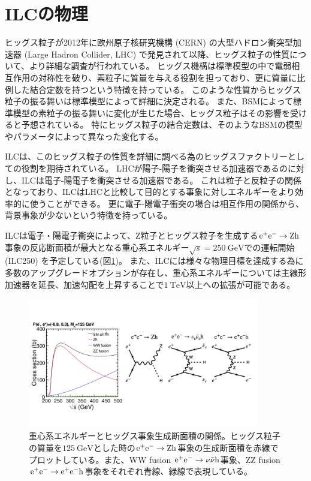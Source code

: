 \section{ILCの物理} \label{Intro:PhysicsofILC}

ヒッグス粒子が2012年に欧州原子核研究機構 (CERN) の大型ハドロン衝突型加速器 (Large Hadron Collider, LHC) で発見されて以降、ヒッグス粒子の性質について、より詳細な調査が行われている。
ヒッグス機構は標準模型の中で電弱相互作用の対称性を破り、素粒子に質量を与える役割を担っており、更に質量に比例した結合定数を持つという特徴を持っている。
このような性質からヒッグス粒子の振る舞いは標準模型によって詳細に決定される。
また、BSMによって標準模型の素粒子の振る舞いに変化が生じた場合、ヒッグス粒子はその影響を受けると予想されている。
特にヒッグス粒子の結合定数は、そのようなBSMの模型やパラメータによって異なった変化する。

ILCは、このヒッグス粒子の性質を詳細に調べる為のヒッグスファクトリーとしての役割を期待されている。
LHCが陽子-陽子を衝突させる加速器であるのに対し、ILCは電子-陽電子を衝突させる加速器である。
これは粒子と反粒子の関係となっており、ILCはLHCと比較して目的とする事象に対しエネルギーをより効率的に使うことができる。
更に電子-陽電子衝突の場合は相互作用の関係から、背景事象が少ないという特徴を持っている。

ILCは電子・陽電子衝突によって、Z粒子とヒッグス粒子を生成する$\rm e^+e^- \to Zh$事象の反応断面積が最大となる重心系エネルギー$\sqrt{s}=250\ \mathrm{GeV}$での運転開始 (ILC250) を予定している(図\ref{4eetoZH})。
また、ILCには様々な物理目標を達成する為に多数のアップグレードオプションが存在し、重心系エネルギーについては主線形加速器を延長、加速勾配を上昇することで$1\ \mathrm{TeV}$以上への拡張が可能である。

\begin{figure}[htbp]
 \centering
 \includegraphics[trim= 0 50 0 50, width=0.9\textwidth, clip]{Figure/1Introduction/4eetoZH.png}
 \caption[重心系エネルギーとヒッグス事象生成断面積の関係]{重心系エネルギーとヒッグス事象生成断面積の関係\cite{ILCTDRVP}。ヒッグス粒子の質量を$125\ \mathrm{GeV}$とした時の$\rm e^+e^- \to Zh$事象の生成断面積を赤線でプロットしている。また、WW fusion $\rm e^+e^- \to \nu \bar{\nu} h$事象、ZZ fusion $\rm e^+e^- \to e^+ e^- h$事象をそれぞれ青線、緑線で表現している。}
 \label{4eetoZH}
\end{figure}

